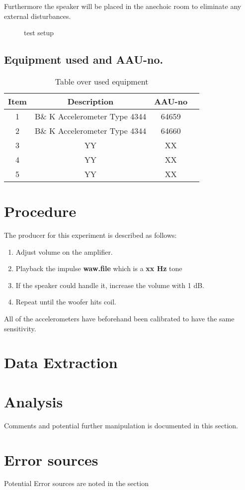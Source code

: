 Furthermore the speaker will be placed in the anechoic room to eliminate any external disturbances.

\begin{figure}[H]
\centering
{}
\caption{test setup}
\label{figure:SpeakertestSetup}
\end{figure}

\subsection*{Equipment used and AAU-no.}

\begin{table}[H]
\centering
{}
\begin{tabular}{S[table-format=1]ccc} \toprule
    {Item} & {Description} & {AAU-no} \\       &  B\& K Accelerometer Type 4344  & 64659   \\ 
    2      &  B\& K Accelerometer Type 4344  & 64660   \\ 
    3      & YY  & XX   \\
    4      & YY  & XX   \\ 
    5      & YY  & XX  \\ \bottomrule 
\end{tabular}
\caption{Table over used equipment}
\end{table}



\section{Procedure}\label{sec:SpeakerTestProcedure}

The producer for this experiment is described as follows:
\begin{enumerate}
\item Adjust volume on the amplifier.
\item Playback the impulse \textbf{waw.file} which is a \textbf{xx Hz} tone 
\item If the speaker could handle it, increase the volume with 1 dB.
\item Repeat until the woofer hits coil. 
\end{enumerate}

All of the accelerometers have beforehand been calibrated to have the same sensitivity.

\section{Data Extraction}

\section{Analysis}

Comments and potential further manipulation is documented in this section. 

\section{Error sources}

Potential Error sources are noted in the section

